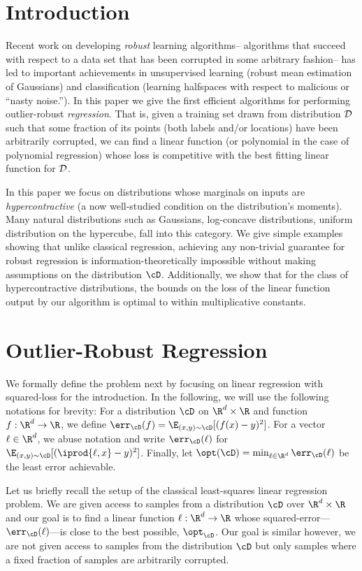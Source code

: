 \section{Introduction}

Recent work on developing {\em robust} learning algorithms--
algorithms that succeed with respect to a data set that has been
corrupted in some arbitrary fashion-- has led to important
achievements in unsupervised learning (robust mean estimation of
Gaussians) and classification (learning halfspaces with respect to
malicious or ``nasty noise.'').  In this paper we give the first
efficient algorithms for performing outlier-robust {\em regression}.  That is,
given a training set drawn from distribution ${\cal D}$ such that some
fraction of its points (both labels and/or locations) have been
arbitrarily corrupted, we can find a linear function (or polynomial in
the case of polynomial regression) whose loss is competitive with the
best fitting linear function for ${\cal D}$.

In this paper we focus on distributions whose marginals on inputs are {\em hypercontractive} (a now well-studied condition on the distribution's moments).  Many natural distributions such as Gaussians, log-concave distributions, uniform distribution on the hypercube, fall into this category.  We give simple examples showing that unlike classical regression, achieving any non-trivial guarantee for robust regression is information-theoretically impossible without making assumptions on the distribution $\cD$. Additionally, we show that for the class of hypercontractive distributions, the bounds on the loss of the linear function output by our algorithm is optimal to within multiplicative constants.

\section{Outlier-Robust Regression}
We formally define the problem next by focusing on linear regression with squared-loss for the introduction. In the following, we will use the following notations for brevity: For a distribution $\cD$ on $\R^d \times \R$ and function $f:\R^d \to \R$, we define $\err_\cD(f) = \E_{(x,y) \sim \cD}[ (f(x) - y)^2]$. For a vector $\ell \in \R^d$, we abuse notation and write $\err_\cD(\ell)$ for $\E_{(x,y) \sim \cD}[ (\iprod{\ell,x} - y)^2]$. Finally, let $\opt(\cD) = \min_{\ell \in \R^d} \err_{\cD}(\ell)$ be the least error achievable. 

Let us briefly recall the setup of the classical least-squares linear regression problem. We are given access to samples from a distribution $\cD$ over $\R^d \times \R$ and our goal is to find a linear function $\ell:\R^d \to \R$ whose squared-error---$\err_{\cD}(\ell)$---is close to the best possible, $\opt_\cD$. Our goal is similar however, we are not given access to samples from the distribution $\cD$ but only samples where a fixed fraction of samples are arbitrarily corrupted. 


